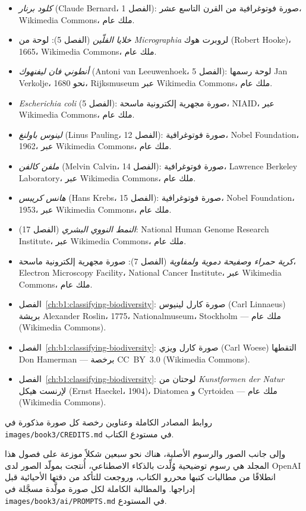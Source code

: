 \begin{itemize}
  \item \emph{كلود برنار} (Claude Bernard، الفصل 1): صورة فوتوغرافية من
        القرن التاسع عشر، Wikimedia Commons، ملك عام.
  \item \emph{خلايا الفلّين} (الفصل 5): لوحة من \emph{Micrographia}
        لروبرت هوك (Robert Hooke)، 1665، Wikimedia Commons، ملك عام.
  \item \emph{أنطوني فان ليفنهوك} (Antoni van Leeuwenhoek، الفصل 5):
        لوحة رسمها Jan Verkolje، نحو 1680، Rijksmuseum عبر
        Wikimedia Commons، ملك عام.
  \item \emph{Escherichia coli} (الفصل 5): صورة مجهرية إلكترونية
        ماسحة، NIAID، عبر Wikimedia Commons، ملك عام.
  \item \emph{لينوس باولنغ} (Linus Pauling، الفصل 12): صورة فوتوغرافية،
        Nobel Foundation، 1962، عبر Wikimedia Commons، ملك عام.
  \item \emph{ملفن كالفن} (Melvin Calvin، الفصل 14): صورة فوتوغرافية،
        Lawrence Berkeley Laboratory، عبر Wikimedia Commons، ملك عام.
  \item \emph{هانس كريبس} (Hans Krebs، الفصل 15): صورة فوتوغرافية،
        Nobel Foundation، 1953، عبر Wikimedia Commons، ملك عام.
  \item \emph{النمط النووي البشري} (الفصل 17): National Human Genome
        Research Institute، عبر Wikimedia Commons، ملك عام.
  \item \emph{كرية حمراء وصفيحة دموية ولمفاوية} (الفصل 7): صورة مجهرية
        إلكترونية ماسحة، Electron Microscopy Facility،
        National Cancer Institute، عبر Wikimedia Commons، ملك عام.
  \item الفصل~\ref{ch:b1:classifying-biodiversity}: صورة كارل لينيوس (Carl Linnaeus) بريشة Alexander Roslin، 1775، Nationalmuseum، Stockholm --- ملك عام (Wikimedia Commons).
  \item الفصل~\ref{ch:b1:classifying-biodiversity}: صورة كارل ويزي (Carl Woese) التقطها Don Hamerman --- برخصة CC~BY~3.0 (Wikimedia Commons).
  \item الفصل~\ref{ch:b1:classifying-biodiversity}: لوحتان من \emph{Kunstformen der Natur} لإرنست هيكل (Ernst Haeckel، 1904)، Diatomea و Cyrtoidea --- ملك عام (Wikimedia Commons).
\end{itemize}

روابط المصادر الكاملة وعناوين رخصة كل صورة مذكورة في
\texttt{images/\allowbreak book3/\allowbreak CREDITS.md} في مستودع الكتاب.

\bigskip
وإلى جانب الصور والرسوم الأصلية، هناك نحو سبعين شكلاً موزعة على فصول
هذا المجلد هي رسوم توضيحية وُلِّدت بالذكاء الاصطناعي، أُنتجت بمولّد الصور
لدى OpenAI انطلاقًا من مطالبات كتبها محررو الكتاب، وروجعت للتأكد من
دقتها الأحيائية قبل إدراجها. والمطالبة الكاملة لكل صورة مولَّدة مسجَّلة في
\texttt{images/\allowbreak book3/\allowbreak ai/\allowbreak PROMPTS.md} في المستودع.
\par\endgroup
\clearpage
